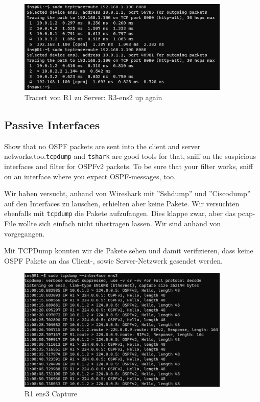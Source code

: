 \documentclass[11pt,titlepage]{article}
\newenvironment{shadedquotation}
 {\begin{shaded*}
  \quoting[leftmargin=0pt, vskip=0pt]
 }
 {\endquoting
 \end{shaded*}
}
\begin{document}
\begin{figure}[H]
  \begin{center}
    \includegraphics[width=0.90\textwidth]{images/tcptracert_R3-ens2-up.png}
    \caption{Tracert von R1 zu Server: R3-ens2 up again}
    \label{fig:RouteFailoverUp}
  \end{center}
\end{figure}


\subsection{Passive Interfaces}
\label{subsec:PassiveInterfaces}
\begin{shadedquotation}
  Show that no OSPF packets are sent into the client and server networks,too.\lstinline!tcpdump! and \lstinline!tshark! are good tools for that, sniff on the suspicious interfaces and filter for OSPFv2 packets. To be sure that your filter works, sniff on an interface where you expect OSPF-messages, too.
\end{shadedquotation}

Wir haben versucht, anhand von Wireshark mit ''Sshdump'' und ''Ciscodump'' auf den Interfaces zu lauschen, erhielten aber keine Pakete.
Wir versuchten ebenfalls mit \lstinline!tcpdump! die Pakete aufzufangen. Dies klappe zwar, aber das pcap-File wollte sich einfach nicht übertragen lassen. Wir sind anhand von \cite{TCPDUMP} vorgegangen.

\medskip

Mit TCPDump konnten wir die Pakete sehen und damit verifizieren, dass keine OSPF Pakete an das Client-, sowie Server-Netzwerk gesendet werden.

\begin{figure}[H]
	\begin{center}
		\includegraphics[width=0.90\textwidth]{"images/R1 OSPF Capture"}
		\caption{R1 ens3 Capture}
		\label{fig:R1-OSPF-Capture}
	\end{center}
\end{figure}
\end{document}

